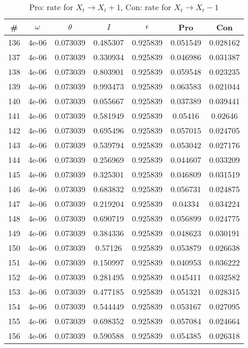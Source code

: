 \newpage
\begin{table}
\caption{Pro: rate for $X_t \rightarrow X_t + 1$, Con: rate for $X_t \rightarrow X_t - 1$}
\begin{tabular*}{\linewidth}{c|c|c|c|c|c|c}
\# & $\omega$ & $\theta$ & $I$ & $\epsilon$ & Pro & Con \\
\hline
136 & 4e-06 & 0.073039 & 0.485307 & 0.925839 & 0.051549 & 0.028162\\
137 & 4e-06 & 0.073039 & 0.330934 & 0.925839 & 0.046986 & 0.031387\\
138 & 4e-06 & 0.073039 & 0.803901 & 0.925839 & 0.059548 & 0.023235\\
139 & 4e-06 & 0.073039 & 0.993473 & 0.925839 & 0.063583 & 0.021044\\
140 & 4e-06 & 0.073039 & 0.055667 & 0.925839 & 0.037389 & 0.039441\\
141 & 4e-06 & 0.073039 & 0.581949 & 0.925839 & 0.05416 & 0.02646\\
142 & 4e-06 & 0.073039 & 0.695496 & 0.925839 & 0.057015 & 0.024705\\
143 & 4e-06 & 0.073039 & 0.539794 & 0.925839 & 0.053042 & 0.027176\\
144 & 4e-06 & 0.073039 & 0.256969 & 0.925839 & 0.044607 & 0.033209\\
145 & 4e-06 & 0.073039 & 0.325301 & 0.925839 & 0.046809 & 0.031519\\
146 & 4e-06 & 0.073039 & 0.683832 & 0.925839 & 0.056731 & 0.024875\\
147 & 4e-06 & 0.073039 & 0.219204 & 0.925839 & 0.04334 & 0.034224\\
148 & 4e-06 & 0.073039 & 0.690719 & 0.925839 & 0.056899 & 0.024775\\
149 & 4e-06 & 0.073039 & 0.384336 & 0.925839 & 0.048623 & 0.030191\\
150 & 4e-06 & 0.073039 & 0.57126 & 0.925839 & 0.053879 & 0.026638\\
151 & 4e-06 & 0.073039 & 0.150997 & 0.925839 & 0.040953 & 0.036222\\
152 & 4e-06 & 0.073039 & 0.281495 & 0.925839 & 0.045411 & 0.032582\\
153 & 4e-06 & 0.073039 & 0.477185 & 0.925839 & 0.051321 & 0.028315\\
154 & 4e-06 & 0.073039 & 0.544449 & 0.925839 & 0.053167 & 0.027095\\
155 & 4e-06 & 0.073039 & 0.698352 & 0.925839 & 0.057084 & 0.024664\\
156 & 4e-06 & 0.073039 & 0.590588 & 0.925839 & 0.054385 & 0.026318\\

\end{tabular*}
\end{table}
